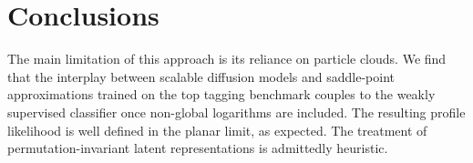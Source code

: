 \section{Conclusions}\label{sec:conclusions}

The main limitation of this approach is its reliance on particle clouds.
We find that the interplay between scalable diffusion models and
saddle-point approximations trained on the top tagging benchmark couples
to the weakly supervised classifier once non-global logarithms are
included. The resulting profile likelihood is well defined in the planar
limit, as expected. The treatment of permutation-invariant latent
representations is admittedly heuristic.

